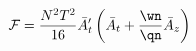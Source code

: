 \begin{equation}
{\cal F} = {N^2 T^2\over 16} \bar{A}_t' \left( \bar{A}_t + {\wn\over \qn} \bar{A}_z\right)\,
\label{gen_fun}
\end{equation}

